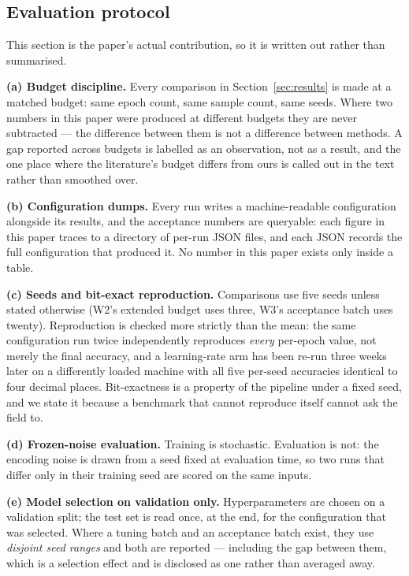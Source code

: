 \documentclass[11pt]{article}
\begin{document}
\subsection{Evaluation protocol}
This section is the paper's actual contribution, so it is written out rather
than summarised.

\textbf{(a) Budget discipline.} Every comparison in Section~\ref{sec:results} is
made at a matched budget: same epoch count, same sample count, same seeds. Where
two numbers in this paper were produced at different budgets they are never
subtracted --- the difference between them is not a difference between methods.
A gap reported across budgets is labelled as an observation, not as a result,
and the one place where the literature's budget differs from ours is called out
in the text rather than smoothed over.

\textbf{(b) Configuration dumps.} Every run writes a machine-readable
configuration alongside its results, and the acceptance numbers are queryable:
each figure in this paper traces to a directory of per-run JSON files, and each
JSON records the full configuration that produced it. No number in this paper
exists only inside a table.

\textbf{(c) Seeds and bit-exact reproduction.} Comparisons use five seeds unless
stated otherwise (W2's extended budget uses three, W3's acceptance batch uses
twenty). Reproduction is checked more strictly than the mean: the same
configuration run twice independently reproduces \emph{every} per-epoch value,
not merely the final accuracy, and a learning-rate arm has been re-run three
weeks later on a differently loaded machine with all five per-seed accuracies
identical to four decimal places. Bit-exactness is a property of the pipeline
under a fixed seed, and we state it because a benchmark that cannot reproduce
itself cannot ask the field to.

\textbf{(d) Frozen-noise evaluation.} Training is stochastic. Evaluation is not:
the encoding noise is drawn from a seed fixed at evaluation time, so two runs
that differ only in their training seed are scored on the same inputs.

\textbf{(e) Model selection on validation only.} Hyperparameters are chosen on a
validation split; the test set is read once, at the end, for the configuration
that was selected. Where a tuning batch and an acceptance batch exist, they use
\emph{disjoint seed ranges} and both are reported --- including the gap between
them, which is a selection effect and is disclosed as one rather than averaged
away.
\end{document}
